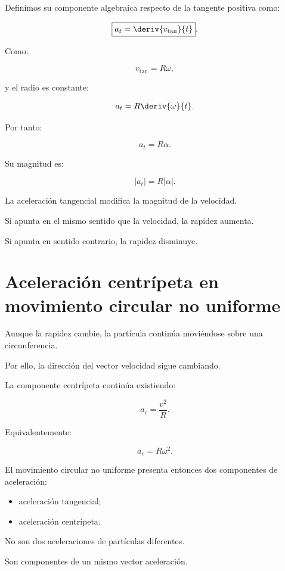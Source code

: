 Definimos su componente algebraica respecto de la tangente positiva como:

\[
\boxed{
a_t=\deriv{v_{\mathrm{tan}}}{t}
}.
\]

Como:

\[
v_{\mathrm{tan}}=R\omega,
\]

y el radio es constante:

\[
a_t
=
R\deriv{\omega}{t}.
\]

Por tanto:

\[
\boxed{
a_t=R\alpha
}.
\]

Su magnitud es:

\[
\boxed{
|a_t|=R|\alpha|
}.
\]

\begin{interpretacion}

La aceleración tangencial modifica la magnitud de la velocidad.

Si apunta en el mismo sentido que la velocidad, la rapidez aumenta.

Si apunta en sentido contrario, la rapidez disminuye.

\end{interpretacion}


\section{Aceleración centrípeta en movimiento circular no uniforme}

Aunque la rapidez cambie, la partícula continúa moviéndose sobre una
circunferencia.

Por ello, la dirección del vector velocidad sigue cambiando.

La componente centrípeta continúa existiendo:

\[
\boxed{
a_c=\frac{v^2}{R}
}.
\]

Equivalentemente:

\[
\boxed{
a_c=R\omega^2
}.
\]

El movimiento circular no uniforme presenta entonces dos componentes de
aceleración:

\begin{itemize}
    \item aceleración tangencial;
    \item aceleración centrípeta.
\end{itemize}

No son dos aceleraciones de partículas diferentes.

Son componentes de un mismo vector aceleración.


